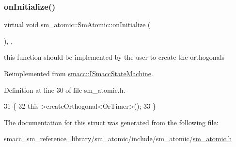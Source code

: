 \subsubsection{\texorpdfstring{on\+Initialize()}{onInitialize()}}
{\footnotesize\ttfamily virtual void sm\+\_\+atomic\+::\+Sm\+Atomic\+::on\+Initialize (\begin{DoxyParamCaption}{ }\end{DoxyParamCaption})\hspace{0.3cm}{\ttfamily [inline]}, {\ttfamily [override]}, {\ttfamily [virtual]}}



this function should be implemented by the user to create the orthogonals 



Reimplemented from \hyperlink{classsmacc_1_1ISmaccStateMachine_ac2982c6c8283663e5e1e8a7c82f511ec}{smacc\+::\+I\+Smacc\+State\+Machine}.



Definition at line 30 of file sm\+\_\+atomic.\+h.


\begin{DoxyCode}
31     \{
32         this->createOrthogonal<OrTimer>();
33     \}
\end{DoxyCode}


The documentation for this struct was generated from the following file\+:\begin{DoxyCompactItemize}
\item 
smacc\+\_\+sm\+\_\+reference\+\_\+library/sm\+\_\+atomic/include/sm\+\_\+atomic/\hyperlink{sm__atomic_8h}{sm\+\_\+atomic.\+h}\end{DoxyCompactItemize}
